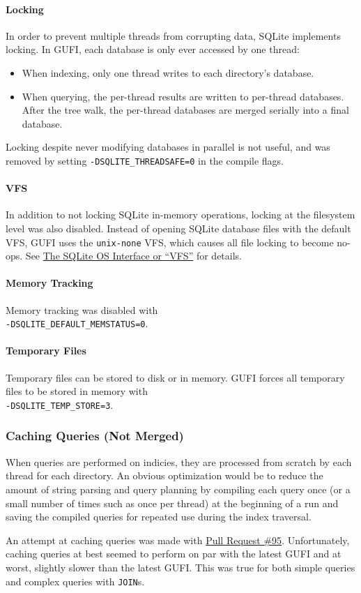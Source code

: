 \paragraph{Locking}
In order to prevent multiple threads from corrupting data, SQLite
implements locking. In GUFI, each database is only ever accessed by
one thread:

\begin{itemize}
\item When indexing, only one thread writes to each directory's
  database.
\item When querying, the per-thread results are written to per-thread
  databases. After the tree walk, the per-thread databases are merged
  serially into a final database.
\end{itemize}

Locking despite never modifying databases in parallel is not useful,
and was removed by setting \texttt{-DSQLITE\_THREADSAFE=0} in the
compile flags.

\paragraph{VFS}
In addition to not locking SQLite in-memory operations, locking at the
filesystem level was also disabled. Instead of opening SQLite database
files with the default VFS, GUFI uses the \texttt{unix-none} VFS,
which causes all file locking to become no-ops. See
\href{https://www.sqlite.org/vfs.html}{The SQLite OS Interface or
  ``VFS''} for details.

\paragraph{Memory Tracking}
Memory tracking was disabled with \\
\noindent \texttt{-DSQLITE\_DEFAULT\_MEMSTATUS=0}.

\paragraph{Temporary Files}
Temporary files can be stored to disk or in memory. GUFI forces all
temporary files to be stored in memory with \\
\texttt{-DSQLITE\_TEMP\_STORE=3}.

\subsubsection{Caching Queries (Not Merged)}
When queries are performed on indicies, they are processed from
scratch by each thread for each directory. An obvious optimization
would be to reduce the amount of string parsing and query planning by
compiling each query once (or a small number of times such as once per
thread) at the beginning of a run and saving the compiled queries for
repeated use during the index traversal.

An attempt at caching queries was made with
\href{https://github.com/mar-file-system/GUFI/pull/95}{Pull Request
  \#95}. Unfortunately, caching queries at best seemed to perform on
par with the latest GUFI and at worst, slightly slower than the latest
GUFI. This was true for both simple queries and complex queries with
\texttt{JOIN}s.
